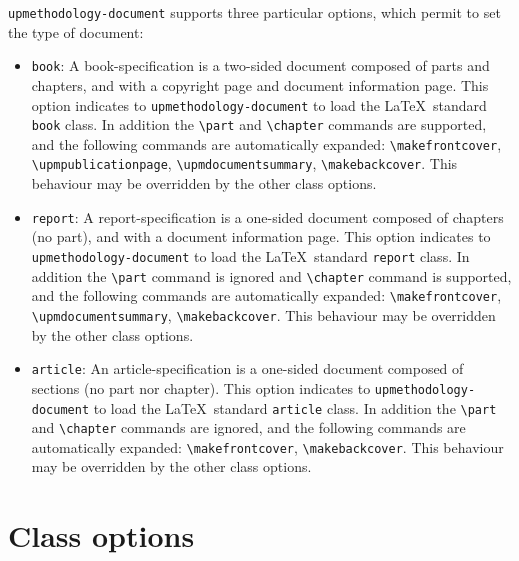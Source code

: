 \documentclass[book,taskpackage,specpackage,codepackage]{upmethodology-document}
\begin{document}
\texttt{upmethodology-document} supports three particular options, which permit to set the type of document:
\begin{itemize}
\item \texttt{book}: A book-specification is a two-sided document composed of parts and chapters, and with a copyright page and document information page. This option indicates to \texttt{upmethodology-document} to load the \LaTeX\ standard \texttt{book} class. In addition the \texttt{{\textbackslash}part} and \texttt{{\textbackslash}chapter} commands are supported, and the following commands are automatically expanded: \texttt{{\textbackslash}makefrontcover}, \texttt{{\textbackslash}upmpublicationpage}, \texttt{{\textbackslash}upmdocumentsummary}, \texttt{{\textbackslash}makebackcover}. This behaviour may be overridden by the other class options.

\item \texttt{report}: A report-specification is a one-sided document composed of chapters (no part), and with a document information page. This option indicates to \texttt{upmethodology-document} to load the \LaTeX\ standard \texttt{report} class. In addition the \texttt{{\textbackslash}part} command is ignored and \texttt{{\textbackslash}chapter} command is supported, and the following commands are automatically expanded: \texttt{{\textbackslash}makefrontcover}, \texttt{{\textbackslash}upmdocumentsummary}, \texttt{{\textbackslash}makebackcover}. This behaviour may be overridden by the other class options.

\item \texttt{article}: An article-specification is a one-sided document composed of sections (no part nor chapter). This option indicates to \texttt{upmethodology-document} to load the \LaTeX\ standard \texttt{article} class. In addition the \texttt{{\textbackslash}part} and \texttt{{\textbackslash}chapter} commands are ignored, and the following commands are automatically expanded: \texttt{{\textbackslash}makefrontcover}, \texttt{{\textbackslash}makebackcover}. This behaviour may be overridden by the other class options.

\end{itemize}

\section{Class options}
\end{document}
